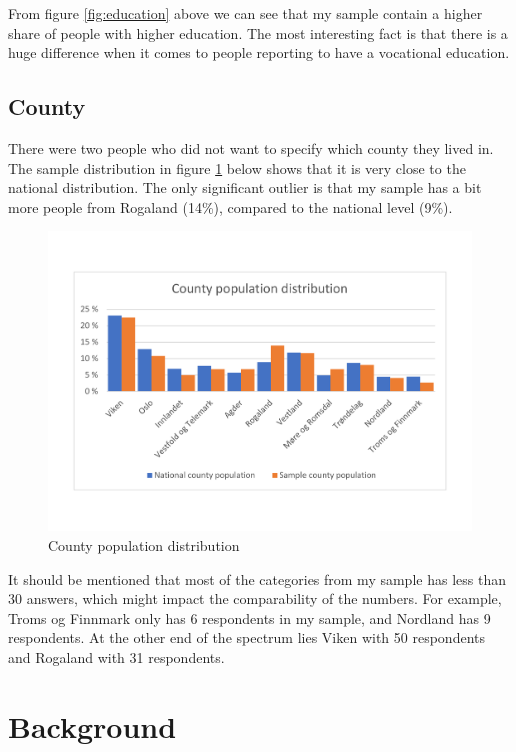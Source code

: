 From figure \ref{fig:education} above we can see that my sample contain a higher share of people with higher education. The most interesting fact is that there is a huge difference when it comes to people reporting to have a vocational education. 

\subsection{County}
There were two people who did not want to specify which county they lived in. The sample distribution in figure \ref{fig:county} below shows that it is very close to the national distribution. The only significant outlier is that my sample has a bit more people from Rogaland (14\%), compared to the national level (9\%).

\begin{figure}[H]
    \centering
    \includegraphics[scale=0.45]{figures/diagrams/county_ssb.pdf}
    \caption{County population distribution}
    \label{fig:county}
\end{figure}

It should be mentioned that most of the categories from my sample has less than 30 answers, which might impact the comparability of the numbers. For example, Troms og Finnmark only has 6 respondents in my sample, and Nordland has 9 respondents. At the other end of the spectrum lies Viken with 50 respondents and Rogaland with 31 respondents. 

\section{Background}

